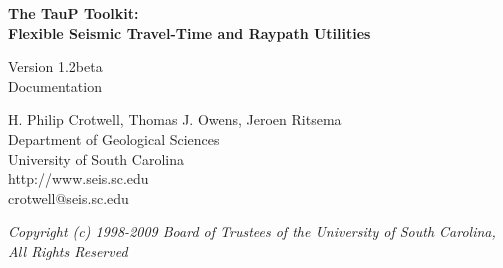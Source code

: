 
\begin{titlepage}
\begin{center}

\vspace{2in}

\LARGE
\textbf{
The TauP Toolkit: \\
Flexible Seismic Travel-Time and Raypath Utilities \\
}

\large
Version 1.2beta \\
Documentation 

\vspace{3in}

H. Philip Crotwell, Thomas J. Owens, Jeroen Ritsema \\
Department of Geological Sciences \\
University of South Carolina \\
http://www.seis.sc.edu \\
crotwell@seis.sc.edu 

\vspace{3in}

\textit{
\normalsize 
Copyright (c) 1998-2009 Board of Trustees of the University of South Carolina, \\
All Rights Reserved
\normalsize}

\end{center}
\end{titlepage}

